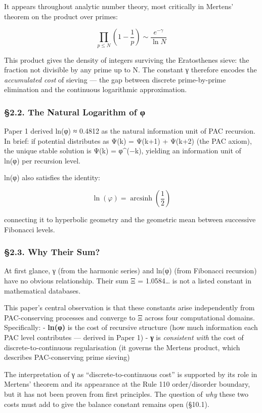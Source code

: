 \documentclass[
  11pt,
  a4paper]{article}
\begin{document}
It appears throughout analytic number theory, most critically in
Mertens' theorem on the product over primes:

\[\prod_{p \leq N} \left(1 - \frac{1}{p}\right) \sim \frac{e^{-\gamma}}{\ln N}\]

This product gives the density of integers surviving the Eratosthenes
sieve: the fraction not divisible by any prime up to N. The constant γ
therefore encodes the \emph{accumulated cost} of sieving --- the gap
between discrete prime-by-prime elimination and the continuous
logarithmic approximation.

\subsubsection{§2.2. The Natural Logarithm of
φ}\label{the-natural-logarithm-of-ux3c6}

Paper 1 derived ln(φ) ≈ 0.4812 as the natural information unit of PAC
recursion. In brief: if potential distributes as Ψ(k) = Ψ(k+1) + Ψ(k+2)
(the PAC axiom), the unique stable solution is Ψ(k) = φ\^{}(−k),
yielding an information unit of ln(φ) per recursion level.

ln(φ) also satisfies the identity:

\[\ln(\varphi) = \operatorname{arcsinh}\left(\frac{1}{2}\right)\]

connecting it to hyperbolic geometry and the geometric mean between
successive Fibonacci levels.

\subsubsection{§2.3. Why Their Sum?}\label{why-their-sum}

At first glance, γ (from the harmonic series) and ln(φ) (from Fibonacci
recursion) have no obvious relationship. Their sum Ξ = 1.0584\ldots{} is
not a listed constant in mathematical databases.

This paper's central observation is that these constants arise
independently from PAC-conserving processes and converge to Ξ across
four computational domains. Specifically: - \textbf{ln(φ)} is the cost
of recursive structure (how much information each PAC level contributes
--- derived in Paper 1) - \textbf{γ} is \emph{consistent with} the cost
of discrete-to-continuous regularisation (it governs the Mertens
product, which describes PAC-conserving prime sieving)

The interpretation of γ as ``discrete-to-continuous cost'' is supported
by its role in Mertens' theorem and its appearance at the Rule 110
order/disorder boundary, but it has not been proven from first
principles. The question of \emph{why} these two costs must add to give
the balance constant remains open (§10.1).
\end{document}

